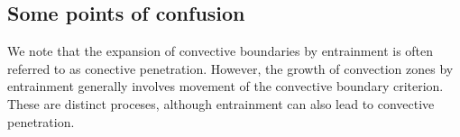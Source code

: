 \subsection{Some points of confusion}
We note that the expansion of convective boundaries by entrainment is often referred to as conective penetration.
However, the growth of convection zones by entrainment generally involves movement of the convective boundary criterion.
These are distinct proceses, although entrainment can also lead to convective penetration.
